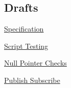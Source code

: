 \subsection*{Drafts}


\begin{DoxyItemize}
\item \hyperlink{doc_decisions_specification_md}{Specification}
\item \hyperlink{doc_decisions_script_testing_md}{Script Testing}
\item \hyperlink{doc_decisions_null_pointer_checks_md}{Null Pointer Checks}
\item \hyperlink{doc_decisions_pubsub_md}{Publish Subscribe} 
\end{DoxyItemize}